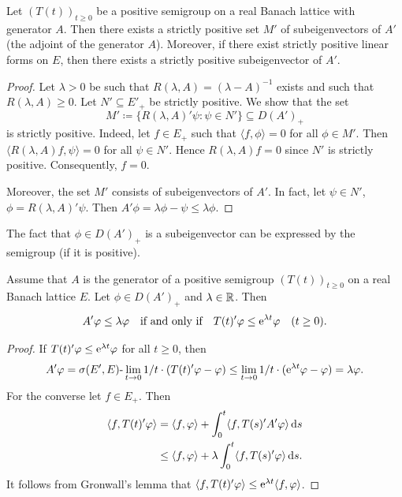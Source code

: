 \begin{proposition}\label{prop:c2-3.5}
%
Let $(T(t))_{t \geq 0}$ be a positive semigroup on a real Banach lattice with generator $A$.
Then there exists a strictly positive set $M'$ of subeigenvectors of\/ $A'$ (the adjoint of the generator $A$).
Moreover, if there exist strictly positive linear forms on $E$, then there exists a strictly positive subeigenvector of\/ $A'$.
\end{proposition}
\begin{proof}
Let $\lambda > 0$ be such that $R(\lambda,A) = (\lambda - A)^{-1}$ exists and such that $R(\lambda,A) \geq 0$.
Let $N' \subseteq E'_{+}$ be strictly positive.
We show that the set 
\[
M' \coloneq \{R(\lambda,A)'\psi \colon \psi \in N'\} \subseteq D(A')_{+}
\]
is strictly positive.
Indeed, let $f \in E_{+}$ such that $\langle f,\phi \rangle = 0$ for all $\phi \in M'$.
Then $\langle R(\lambda,A)f,\psi \rangle = 0$ for all $\psi \in N'$.
Hence $R(\lambda,A)f = 0$ since $N'$ is strictly positive.
Consequently, $f = 0$.

Moreover, the set $M'$ consists of
subeigenvectors of\/ $A'$. In fact, let $\psi \in N'$, $\phi = R(\lambda,A)'\psi$. Then
$A'\phi = \lambda\phi - \psi \leq \lambda\phi$.
\end{proof}
The fact that $\phi \in D(A')_{+}$ is a subeigenvector can be expressed by the
semigroup (if it is positive).
\begin{proposition}\label{prop:c2-3.6}
Assume that $A$ is the generator of a positive semigroup $(T(t))_{t \geq 0}$ on a real Banach lattice $E$. 
Let $\phi \in D(A')_{+}$ and $\lambda \in \mathbb{R}$. 
Then
\[
A'\phi \leq \lambda \phi \quad\text{if and only if}\quad T(t)'\phi \leq \eu^{\lambda t}\phi \quad (t \geq 0) .
\]
\end{proposition}
\begin{proof}
If\/ $T(t)'\phi \leq \eu^{\lambda t} \phi$ for all $t \geq 0$, then
\begin{align*}
A'\phi = \sigma(E',E)\text{-}\lim_{t \to 0} 1/t \cdot (T(t)'\phi - \phi) \leq \lim_{t \to 0} 1/t \cdot (\eu^{\lambda t}\phi - \phi) = \lambda\phi.
\end{align*}
For the converse let $f \in E_{+}$. Then
\begin{align*}
\langle f,T(t)'\phi \rangle &= \langle f,\phi \rangle + \int_{0}^{t} \langle f,T(s)'A'\phi \rangle \ds\\
&\leq \langle f,\phi \rangle + \lambda \int_{0}^{t} \langle f,T(s)'\phi \rangle \ds .
\end{align*}
It follows from Gronwall's lemma that $\langle f,T(t)'\phi \rangle \leq \eu^{\lambda t} \langle f,\phi \rangle$.
\end{proof}
